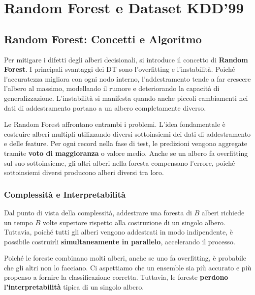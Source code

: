 \section{Random Forest e Dataset KDD'99}

\subsection{Random Forest: Concetti e Algoritmo}

Per mitigare i difetti degli alberi decisionali, si
introduce il concetto di \textbf{Random Forest}. I
principali svantaggi dei DT sono l'overfitting e
l'instabilità. Poiché l'accuratezza migliora con ogni
nodo interno, l'addestramento tende a far crescere
l'albero al massimo, modellando il rumore e deteriorando
la capacità di generalizzazione. L'instabilità si
manifesta quando anche piccoli cambiamenti nei dati di
addestramento portano a un albero completamente diverso.

Le Random Forest affrontano entrambi i problemi. L'idea
fondamentale è costruire alberi multipli utilizzando
diversi sottoinsiemi dei dati di addestramento e delle
feature. Per ogni record nella fase di test, le
predizioni vengono aggregate tramite \textbf{voto di
maggioranza} o valore medio. Anche se un albero fa
overfitting sul suo sottoinsieme, gli altri alberi
nella foresta compensano l'errore, poiché sottoinsiemi
diversi producono alberi diversi tra loro.

\subsubsection{Complessità e Interpretabilità}

Dal punto di vista della complessità, addestrare una
foresta di $B$ alberi richiede un tempo $B$ volte
superiore rispetto alla costruzione di un singolo albero.
Tuttavia, poiché tutti gli alberi vengono addestrati in
modo indipendente, è possibile costruirli
\textbf{simultaneamente in parallelo}, accelerando
il processo.

Poiché le foreste combinano molti alberi, anche se uno
fa overfitting, è probabile che gli altri non lo facciano.
Ci aspettiamo che un ensemble sia più accurato e più
propenso a fornire la classificazione corretta. Tuttavia,
le foreste \textbf{perdono l'interpretabilità} tipica
di un singolo albero.

